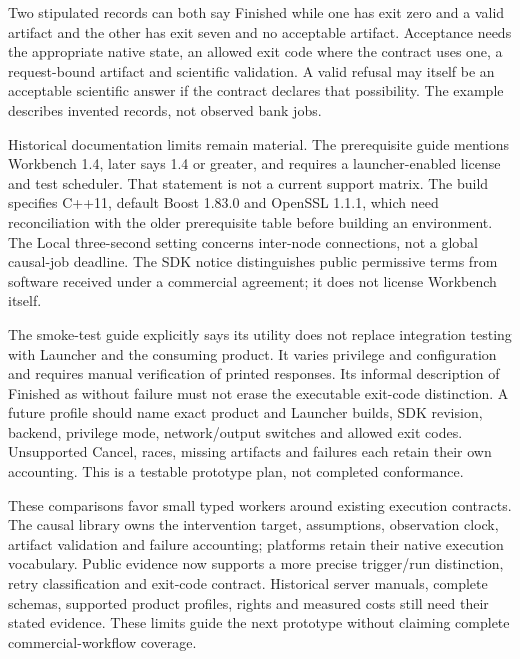 Two stipulated records can both say Finished while one has exit zero and
a valid artifact and the other has exit seven and no acceptable artifact.
Acceptance needs the appropriate native state, an allowed exit code where
the contract uses one, a request-bound artifact and scientific validation.
A valid refusal may itself be an acceptable scientific answer if the contract
declares that possibility. The example describes invented records, not
observed bank jobs.\citep{exec24_workflow_contracts_reference}

Historical documentation limits remain material. The prerequisite guide
mentions Workbench 1.4, later says 1.4 or greater, and requires a launcher-enabled
license and test scheduler. That statement is not a current support matrix.
The build specifies C++11, default Boost 1.83.0 and OpenSSL 1.1.1, which need
reconciliation with the older prerequisite table before building an environment.
The Local three-second setting concerns inter-node connections, not a global
causal-job deadline. The SDK notice distinguishes public permissive terms
from software received under a commercial agreement; it does not license
Workbench itself.\citep{exec24_workflow_contracts_posit}

The smoke-test guide explicitly says its utility does not replace integration
testing with Launcher and the consuming product. It varies privilege and
configuration and requires manual verification of printed responses. Its
informal description of Finished as without failure must not erase the
executable exit-code distinction. A future profile should name exact product
and Launcher builds, SDK revision, backend, privilege mode, network/output
switches and allowed exit codes. Unsupported Cancel, races, missing artifacts
and failures each retain their own accounting. This is a testable prototype
plan, not completed conformance.\citep{exec24_workflow_contracts_posit}

These comparisons favor small typed workers around existing execution
contracts. The causal library owns the intervention target, assumptions,
observation clock, artifact validation and failure accounting; platforms
retain their native execution vocabulary. Public evidence now supports a
more precise trigger/run distinction, retry classification and exit-code
contract. Historical server manuals, complete schemas, supported product
profiles, rights and measured costs still need their stated evidence. These
limits guide the next prototype without claiming complete commercial-workflow
coverage.
